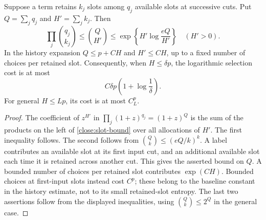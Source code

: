 \begin{lemma}\label{close:entropy}
Suppose a term retains $k_j$ slots among $q_j$ available slots at
successive cuts. Put $Q=\sum_jq_j$ and $H'=\sum_jk_j$. Then
\begin{equation}\label{close:slot-bound}
 \prod_j\binom{q_j}{k_j}
 \leq\binom{Q}{H'}
 \leq\exp\left\{H'\log\frac{eQ}{H'}\right\}
 \quad (H'>0).
\end{equation}
In the history expansion $Q\leq p+C H$ and $H'\leq C H$, up to a
fixed number of choices per retained slot. Consequently, when $H\leq\delta p$,
the logarithmic selection cost is at most
\begin{equation}\label{close:entropy-small}
 C\delta p\left(1+\log\frac1\delta\right).
\end{equation}
For general $H\leq Lp$, its cost is at most $C_L^p$.
\end{lemma}
\begin{proof}
The coefficient of $z^{H'}$ in
$\prod_j(1+z)^{q_j}=(1+z)^Q$ is the sum of the products on the
left of \eqref{close:slot-bound} over all allocations of $H'$.
The first inequality follows. The second follows from
$\binom Qk\leq(eQ/k)^k$. A label contributes an available slot at
its first input cut, and an additional available slot each time it
is retained across another cut. This gives the asserted bound on
$Q$. A bounded number of choices per retained slot contributes
$\exp(C H)$. Bounded choices at first-input slots instead cost
$C^p$; these belong to the baseline constant in the history
estimate, not to its small retained-slot entropy.
The last two assertions follow from the displayed inequalities,
using $\binom Qk\leq2^Q$ in the general case.
\end{proof}

